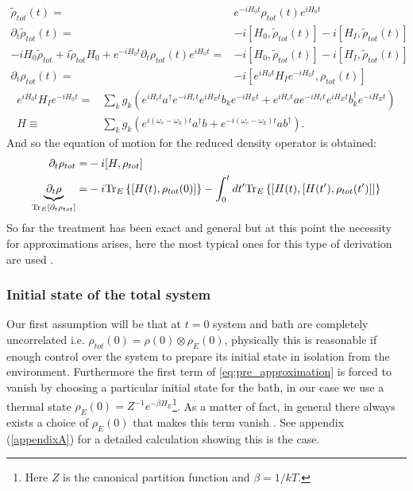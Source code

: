 \begin{align}
  \tilde{\rho}_{tot}(t) =& e^{-iH_{0}t} \rho_{tot}(t)e^{iH_{0}t}\\
  \partial_{t} \tilde{\rho}_{tot}(t) =& -i[H_{0}, \tilde{\rho}_{tot}(t)] - i[H_I,\tilde{\rho}_{tot}(t) ]\\
  -iH_{0}\tilde{\rho}_{tot} +i\tilde{\rho}_{tot}H_{0} + e^{-iH_{0}t}\partial_{t} \rho_{tot}(t)e^{iH_{0}t} =&-i[H_{0}, \tilde{\rho}_{tot}(t)] - i[H_I,\tilde{\rho}_{tot}(t) ]\\
\partial_{t} \rho_{tot}(t) =&-i[e^{iH_{0}t}H_Ie^{-iH_{0}t},\rho_{tot}(t) ]
\end{align}
\begin{align}
  e^{iH_{0}t} H_{I}e^{-iH_{0}t} =& \sum_{k}g_{k}\left(e^{iH_{c}t}a^{\dagger}e^{-iH_{c}t} e^{iH_{E}t}b_{k}e^{-iH_{E}t} +
                                   e^{iH_{c}t}ae^{-iH_{c}t} e^{iH_{E}t}b_{k}^{\dagger}e^{-iH_{E}t}\right)\\
  H\equiv & \sum_{k} g_{k} \left( e^{i(\omega_{c}-\omega_{k})t}a^{\dagger}b +   e^{-i(\omega_{c}-\omega_{k})t}ab^{\dagger} \right).
\end{align}
And so the equation of motion for the reduced density operator is obtained:
\begin{align}
  \partial_{t}\rho_{tot} =& -i[H, \rho_{tot}]\\
 \underbrace{\partial_{t}\rho}_{\mathrm{Tr}_{E}\left[\partial_{t}\rho_{tot}\right]} =& -i\mathrm{Tr}_{E}\left\{[H(t), \rho_{tot}(0)]\right\} - \int_{0}^{t}dt'\mathrm{Tr}_{E}\left\{[H(t), [H(t'), \rho_{tot}(t')]]\right\}\label{eq:pre_approximation}
\end{align}
So far the treatment has been exact and general but at this point the necessity for approximations arises, here the most typical ones for this
type of derivation are used \cite{hornberger2009introduction,wiseman_quantum_2010,breuer2002theory}.
\subsubsection{Initial state of the total system}
Our first assumption will be that at $t=0$ system and bath are completely uncorrelated i.e. $\rho_{tot}(0)=\rho(0)\otimes \rho_{E}(0)$,
physically this is reasonable if enough control over the system to prepare its initial state in isolation from the environment.
Furthermore the first term of \eqref{eq:pre_approximation} is forced to vanish by choosing a particular initial state for the bath, in our case
we use a thermal state $\rho_{E}(0)=Z^{-1}e^{-\beta H_{E}}$\footnote{Here $Z$ is the canonical partition function and $\beta=1/kT$.}. As a matter of fact, in general there always exists a choice of $\rho_{E}(0)$ that makes this term vanish \cite{wiseman_quantum_2010}. See appendix (\ref{appendixA}) for a detailed calculation showing this is the case.

